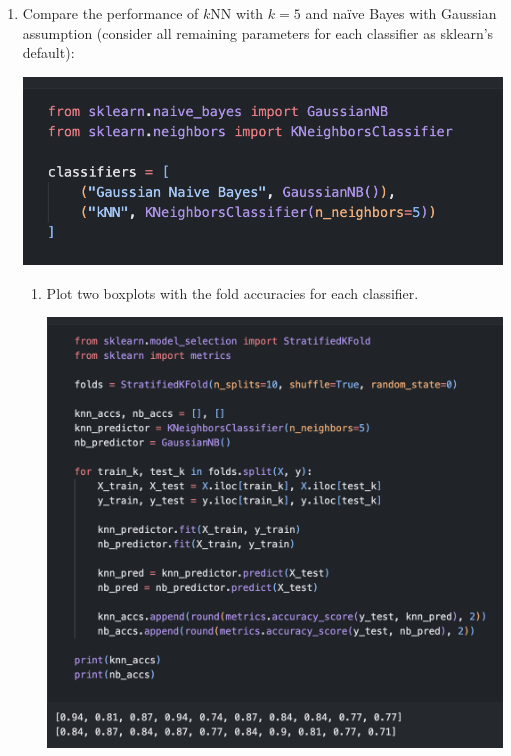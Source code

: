 \documentclass[12pt]{article}
\begin{document}
\begin{enumerate}[leftmargin=\labelsep]
    \item Compare the performance of $k$NN with $k = 5$ and naïve Bayes with Gaussian assumption
    (consider all remaining parameters for each classifier as sklearn's default):

    \begin{center}
        \includegraphics[scale=0.8]{images/code3.png}
    \end{center}

    \begin{enumerate}
        \item Plot two boxplots with the fold accuracies for each classifier.
        
        \begin{center}
            \includegraphics[scale=0.5]{images/code4.png}
        \end{center}


\end{enumerate}
\end{enumerate}
\end{document}
